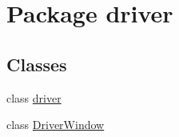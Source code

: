 \hypertarget{namespacedriver}{}\section{Package driver}
\label{namespacedriver}
\subsection*{Classes}
\begin{DoxyCompactItemize}
\item 
class \hyperlink{classdriver_1_1driver}{driver}
\item 
class \hyperlink{classdriver_1_1DriverWindow}{Driver\+Window}
\end{DoxyCompactItemize}
